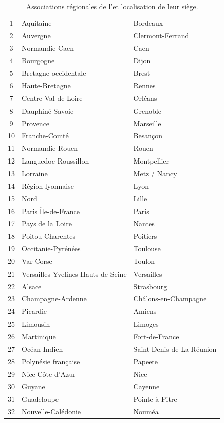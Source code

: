 \begin{table}[H]
\begin{tabularx}{\linewidth}{@{}
c
Y
Y
@{}}
1  & Aquitaine & Bordeaux \\
2  & Auvergne & Clermont-Ferrand \\
3  & Normandie Caen & Caen \\
4  & Bourgogne & Dijon \\
5  & Bretagne occidentale & Brest \\
6  & Haute-Bretagne & Rennes \\
7  & Centre-Val de Loire & Orléans \\
8  & Dauphiné-Savoie & Grenoble \\
9  & Provence & Marseille \\
10 & Franche-Comté & Besançon \\
11 & Normandie Rouen & Rouen \\
12 & Languedoc-Roussillon & Montpellier \\
13 & Lorraine & Metz / Nancy \\
14 & Région lyonnaise & Lyon \\
15 & Nord & Lille \\
16 & Paris Île-de-France & Paris \\
17 & Pays de la Loire & Nantes \\
18 & Poitou-Charentes & Poitiers \\
19 & Occitanie-Pyrénées & Toulouse \\
20 & Var-Corse & Toulon \\
21 & Versailles-Yvelines-Hauts-de-Seine & Versailles \\
22 & Alsace & Strasbourg \\
23 & Champagne-Ardenne & Châlons-en-Champagne \\
24 & Picardie & Amiens \\
25 & Limousin & Limoges \\
26 & Martinique & Fort-de-France \\
27 & Océan Indien & Saint-Denis de La Réunion \\
28 & Polynésie française & Papeete \\
29 & Nice Côte d'Azur & Nice \\
30 & Guyane & Cayenne \\
31 & Guadeloupe & Pointe-à-Pitre \\
32 & Nouvelle-Calédonie & Nouméa \\

\bottomrule
\end{tabularx}

\caption{Associations régionales de l'\UnionIHEDN et localisation de leur siège.}
\label{tab:associations_regionales_ihedn}

\end{table}